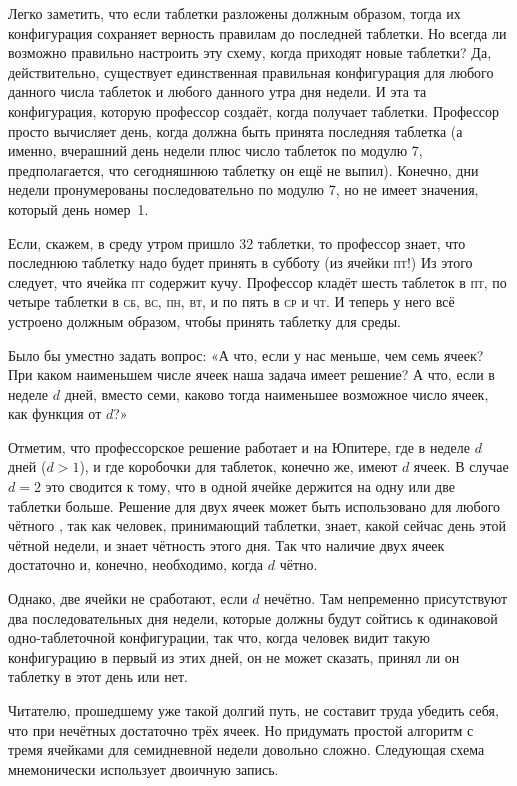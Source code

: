 Легко заметить, что если таблетки разложены должным образом, тогда их конфигурация сохраняет верность правилам до последней таблетки.
Но всегда ли возможно правильно настроить эту схему, когда приходят новые таблетки? Да, действительно, существует единственная правильная конфигурация для любого данного числа таблеток и любого данного утра дня недели.
И эта та конфигурация, которую профессор создаёт, когда получает таблетки.
Профессор просто вычисляет день, когда должна быть принята последняя таблетка (а именно, вчерашний день недели плюс число таблеток по модулю 7,
предполагается, что сегодняшнюю таблетку он ещё не выпил).
Конечно, дни недели пронумерованы последовательно  по модулю 7, но не имеет значения, который день номер~1.

Если, скажем, в среду утром пришло 32 таблетки, то профессор знает, что последнюю таблетку надо будет принять в субботу (из ячейки \textsc{пт}!) Из этого следует, что ячейка \textsc{пт} содержит кучу.
Профессор кладёт шесть таблеток в \textsc{пт}, по четыре таблетки в \textsc{сб}, \textsc{вс}, \textsc{пн}, \textsc{вт}, и по пять в \textsc{ср} и \textsc{чт}.
И теперь у него всё устроено должным образом, чтобы принять таблетку для среды.
\heart

Было бы уместно задать вопрос:
«А что, если у нас меньше, чем семь ячеек?
При каком наименьшем числе ячеек наша задача имеет решение?
А что, если в неделе $d$ дней, вместо семи,
каково тогда наименьшее возможное число ячеек, как функция от $d$?»

Отметим, что профессорское решение работает и на Юпитере, где в неделе $d$ дней ($d>1$), и где коробочки для таблеток, конечно же, имеют $d$ ячеек.
В случае $d=2$ это сводится к тому, что в одной ячейке держится на одну или две таблетки больше.
Решение для двух ячеек может быть использовано для любого чётного , так как человек, принимающий таблетки, знает, какой сейчас день этой чётной недели, и знает чётность этого дня.
Так что наличие двух ячеек достаточно и, конечно, необходимо, когда $d$ чётно.

Однако, две ячейки не сработают, если $d$ нечётно.
Там непременно присутствуют два последовательных дня недели, которые должны будут сойтись к одинаковой одно-таблеточной конфигурации, так что, когда человек видит такую конфигурацию в первый из этих дней, он не может сказать, принял ли он таблетку в этот день или нет.

Читателю, прошедшему уже такой долгий путь, не составит труда убедить себя, что при нечётных достаточно трёх ячеек.
Но придумать простой алгоритм с тремя ячейками для семидневной недели довольно сложно.
Следующая схема мнемонически использует двоичную запись.

